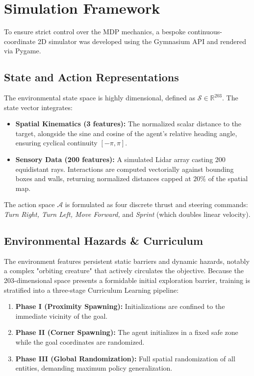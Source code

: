 \documentclass[10pt, twocolumn, letterpaper]{article}
\begin{document}
\section{Simulation Framework}
To ensure strict control over the MDP mechanics, a bespoke continuous-coordinate 2D simulator was developed using the Gymnasium API and rendered via Pygame.

\subsection{State and Action Representations}
The environmental state space is highly dimensional, defined as $\mathcal{S} \in \mathbb{R}^{203}$. The state vector integrates:
\begin{itemize}
    \item \textbf{Spatial Kinematics (3 features):} The normalized scalar distance to the target, alongside the sine and cosine of the agent's relative heading angle, ensuring cyclical continuity $[-\pi, \pi]$.
    \item \textbf{Sensory Data (200 features):} A simulated Lidar array casting 200 equidistant rays. Interactions are computed vectorially against bounding boxes and walls, returning normalized distances capped at $20\%$ of the spatial map.
\end{itemize}
The action space $\mathcal{A}$ is formulated as four discrete thrust and steering commands: \textit{Turn Right, Turn Left, Move Forward,} and \textit{Sprint} (which doubles linear velocity).

\subsection{Environmental Hazards \& Curriculum}
The environment features persistent static barriers and dynamic hazards, notably a complex "orbiting creature" that actively circulates the objective. Because the 203-dimensional space presents a formidable initial exploration barrier, training is stratified into a three-stage Curriculum Learning pipeline:
\begin{enumerate}
    \item \textbf{Phase I (Proximity Spawning):} Initializations are confined to the immediate vicinity of the goal.
    \item \textbf{Phase II (Corner Spawning):} The agent initializes in a fixed safe zone while the goal coordinates are randomized.
    \item \textbf{Phase III (Global Randomization):} Full spatial randomization of all entities, demanding maximum policy generalization.
\end{enumerate}
\end{document}
